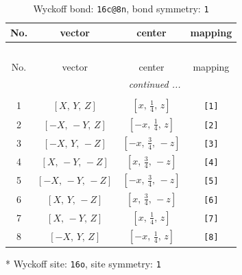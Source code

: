 \documentclass[fleqn,8pt]{jsarticle}
\begin{document}
\renewcommand{\arraystretch}{1.2}
\begin{longtable}{cccc}
\caption{Wyckoff bond: {\tt 16c@8n}, bond symmetry: {\tt 1}}
 \\
 \hline \hline
No. & vector & center & mapping \\ \hline \endfirsthead

\multicolumn{3}{l}{\tablename\ \thetable{}} \\
 \hline \hline
No. & vector & center & mapping \\ \hline \endhead

 \hline \hline
\multicolumn{3}{r}{\footnotesize\it continued ...} \\ \endfoot

 \hline \hline
\multicolumn{3}{r}{} \\ \endlastfoot

1 & $\left[ X,\, Y,\, Z \right]$ & $\left[ x,\, \frac{1}{4},\, z \right]$ & {\tt [1]} \\ \hline
2 & $\left[ - X,\, - Y,\, Z \right]$ & $\left[ - x,\, \frac{1}{4},\, z \right]$ & {\tt [2]} \\ \hline
3 & $\left[ - X,\, Y,\, - Z \right]$ & $\left[ - x,\, \frac{3}{4},\, - z \right]$ & {\tt [3]} \\ \hline
4 & $\left[ X,\, - Y,\, - Z \right]$ & $\left[ x,\, \frac{3}{4},\, - z \right]$ & {\tt [4]} \\ \hline
5 & $\left[ - X,\, - Y,\, - Z \right]$ & $\left[ - x,\, \frac{3}{4},\, - z \right]$ & {\tt [5]} \\ \hline
6 & $\left[ X,\, Y,\, - Z \right]$ & $\left[ x,\, \frac{3}{4},\, - z \right]$ & {\tt [6]} \\ \hline
7 & $\left[ X,\, - Y,\, Z \right]$ & $\left[ x,\, \frac{1}{4},\, z \right]$ & {\tt [7]} \\ \hline
8 & $\left[ - X,\, Y,\, Z \right]$ & $\left[ - x,\, \frac{1}{4},\, z \right]$ & {\tt [8]} \\
\end{longtable}
* Wyckoff site: {\tt 16o}, site symmetry: {\tt 1}
\renewcommand{\arraystretch}{1.2}
\end{document}
